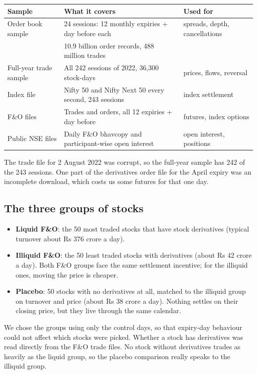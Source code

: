 \documentclass[11pt,a4paper]{article}
\begin{document}
\begin{center}
\small
\begin{tabularx}{\textwidth}{lXl}
\toprule
Sample & What it covers & Used for \\
\midrule
Order book sample & 24 sessions: 12 monthly expiries + day before each & spreads, depth, cancellations \\
 & 10.9 billion order records, 488 million trades & \\
Full-year trade sample & All 242 sessions of 2022, 36,300 stock-days & prices, flows, reversal \\
Index file & Nifty 50 and Nifty Next 50 every second, 243 sessions & index settlement \\
F\&O files & Trades and orders, all 12 expiries + day before & futures, index options \\
Public NSE files & Daily F\&O bhavcopy and participant-wise open interest & open interest, positions \\
\bottomrule
\end{tabularx}
\end{center}

The trade file for 2 August 2022 was corrupt, so the full-year sample has 242 of the 243 sessions.
One part of the derivatives order file for the April expiry was an incomplete download, which
costs us some futures for that one day.

\subsection{The three groups of stocks}

\begin{itemize}
  \item \textbf{Liquid F\&O}: the 50 most traded stocks that have stock derivatives (typical
  turnover about Rs 376 crore a day).
  \item \textbf{Illiquid F\&O}: the 50 least traded stocks with derivatives (about Rs 42 crore a day).
  Both F\&O groups face the same settlement incentive; for the illiquid ones, moving the price is
  cheaper.
  \item \textbf{Placebo}: 50 stocks with no derivatives at all, matched to the illiquid group on
  turnover and price (about Rs 38 crore a day). Nothing settles on their closing price, but they
  live through the same calendar.
\end{itemize}

We chose the groups using only the control days, so that expiry-day behaviour could not affect
which stocks were picked. Whether a stock has derivatives was read directly from the F\&O trade
files. No stock without derivatives trades as heavily as the liquid group, so the placebo
comparison really speaks to the illiquid group.
\end{document}
